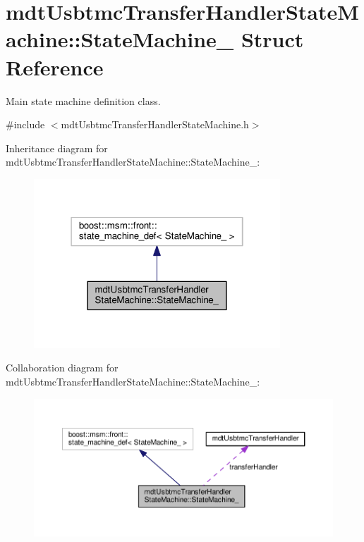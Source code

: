 \hypertarget{structmdt_usbtmc_transfer_handler_state_machine_1_1_state_machine__}{\section{mdt\-Usbtmc\-Transfer\-Handler\-State\-Machine\-:\-:State\-Machine\-\_\- Struct Reference}
\label{structmdt_usbtmc_transfer_handler_state_machine_1_1_state_machine__}
}


Main state machine definition class.  




{\ttfamily \#include $<$mdt\-Usbtmc\-Transfer\-Handler\-State\-Machine.\-h$>$}



Inheritance diagram for mdt\-Usbtmc\-Transfer\-Handler\-State\-Machine\-:\-:State\-Machine\-\_\-\-:\nopagebreak
\begin{figure}[H]
\begin{center}
\leavevmode
\includegraphics[width=262pt]{structmdt_usbtmc_transfer_handler_state_machine_1_1_state_machine____inherit__graph}
\end{center}
\end{figure}


Collaboration diagram for mdt\-Usbtmc\-Transfer\-Handler\-State\-Machine\-:\-:State\-Machine\-\_\-\-:\nopagebreak
\begin{figure}[H]
\begin{center}
\leavevmode
\includegraphics[width=350pt]{structmdt_usbtmc_transfer_handler_state_machine_1_1_state_machine____coll__graph}
\end{center}
\end{figure}
